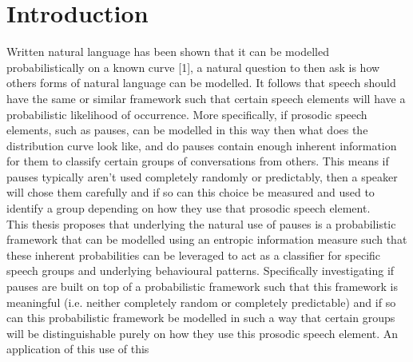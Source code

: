 \chapter{Introduction}



Written natural language has been shown that it can be modelled probabilistically on a known curve [1], a natural question to then ask is how others forms of natural language can be modelled. It follows that speech should have the same or similar framework such that certain speech elements will have a probabilistic likelihood of occurrence. More specifically, if prosodic speech elements, such as pauses, can be modelled in this way then what does the distribution curve look like, and do pauses contain enough inherent information for them to classify certain groups of conversations from others. This means if pauses typically aren't used completely randomly or predictably, then a speaker will chose them carefully and if so can this choice be measured and used to identify a group depending on how they use that prosodic speech element. \\


This thesis proposes that underlying the natural use of pauses is a probabilistic framework that can be modelled using an entropic information measure such that these inherent probabilities can be leveraged to act as a classifier for specific speech groups and underlying behavioural patterns. Specifically investigating if pauses are built on top of a probabilistic framework such that this framework is meaningful (i.e. neither completely random or completely predictable) and if so can this probabilistic framework be modelled in such a way that certain groups will be distinguishable purely on how they use this prosodic speech element. An application of this use of this 

